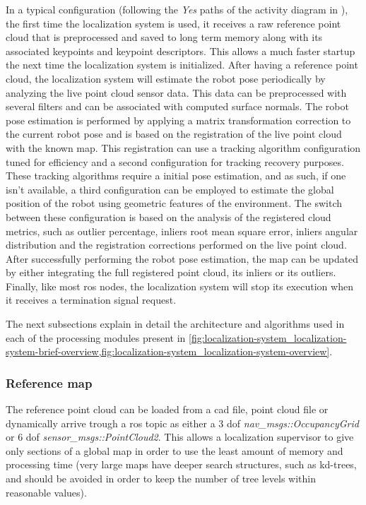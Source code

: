 In a typical configuration (following the \emph{Yes} paths of the activity diagram in ), the first time the localization system is used, it receives a raw reference point cloud that is preprocessed and saved to long term memory along with its associated keypoints and keypoint descriptors. This allows a much faster startup the next time the localization system is initialized. After having a reference point cloud, the localization system will estimate the robot pose periodically by analyzing the live point cloud sensor data. This data can be preprocessed with several filters and can be associated with computed surface normals. The robot pose estimation is performed by applying a matrix transformation correction to the current robot pose and is based on the registration of the live point cloud with the known map. This registration can use a tracking algorithm configuration tuned for efficiency and a second configuration for tracking recovery purposes. These tracking algorithms require a initial pose estimation, and as such, if one isn't available, a third configuration can be employed to estimate the global position of the robot using geometric features of the environment. The switch between these configuration is based on the analysis of the registered cloud metrics, such as outlier percentage, inliers root mean square error, inliers angular distribution and the registration corrections performed on the live point cloud. After successfully performing the robot pose estimation, the map can be updated by either integrating the full registered point cloud, its inliers or its outliers. Finally, like most \gls{ros} nodes, the localization system will stop its execution when it receives a termination signal request.

The next subsections explain in detail the architecture and algorithms used in each of the processing modules present in \cref{fig:localization-system_localization-system-brief-overview,fig:localization-system_localization-system-overview}.


\subsubsection{Reference map}

The reference point cloud can be loaded from a \gls{cad} file, point cloud file or dynamically arrive trough a \gls{ros} topic as either a 3 \gls{dof} \emph{nav\_msgs::OccupancyGrid} or 6 \gls{dof} \emph{sensor\_msgs::PointCloud2}. This allows a localization supervisor to give only sections of a global map in order to use the least amount of memory and processing time (very large maps have deeper search structures, such as kd-trees, and should be avoided in order to keep the number of tree levels within reasonable values).


